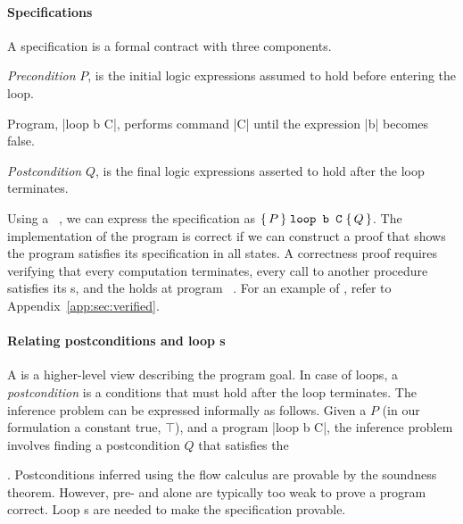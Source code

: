 \paragraph*{Specifications}
A {specification} is a formal contract with three
components.
\begin{enumerate*}

\item \emph{Precondition} \(P\), is the initial
logic expressions assumed to hold before entering the loop.

\item Program, \pr|loop b C|, performs command \pr|C| until the
expression \pr|b| becomes false.

\item \emph{Postcondition} \(Q\), is the final
logic expressions asserted to hold after the loop terminates.

\end{enumerate*}

Using a ~\cite{hoare1969}, we can express the specification as
\(\Hoare{P}{\prm{loop b C}}{Q}\). The implementation of the program
is correct if we can construct a proof that shows the program satisfies its
specification in all states. A correctness proof requires
verifying that every computation terminates, every call to
another procedure satisfies its s, and the 
holds at program ~\cite{furia2010}. For an example of
, refer to Appendix~\ref{app:sec:verified}.

\paragraph*{Relating postconditions and loop s}
A  is a higher-level view describing the program goal. In
case of loops, a \emph{postcondition} is a conditions that must hold after the
loop terminates. The  inference problem
can be expressed informally as follows. Given a 
\(P\) (in our formulation a constant true, \(\top\)),
and a program \pr|loop b C|, the inference problem involves finding a
postcondition \(Q\) that satisfies the 
\begin{prooftree} %
\end{prooftree}.
Postconditions inferred using the flow calculus are provable
by the soundness theorem. However, pre- and
 alone are typically too weak to prove a program correct.
Loop s are needed to make the specification
provable.

